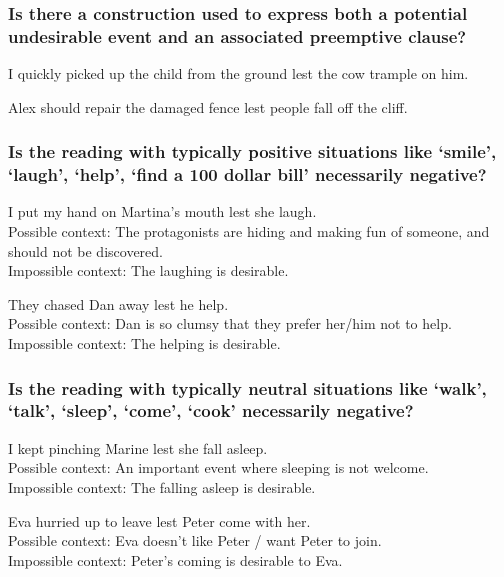 \documentclass[output=paper,colorlinks,citecolor=brown]{langscibook}
\begin{document}
\subsubsection{Is there a construction used to express both a potential undesirable event and an associated preemptive clause?}
\label{2.1.1}

\ea \label{p43} I quickly picked up the child from the ground {\ob}lest the cow trample on him{\cb}.
\z

\ea \label{p44} Alex should repair the damaged fence {\ob}lest people fall off the cliff{\cb}.
\z

\subsubsection{Is the reading with \textbf{typically positive situations} like `smile', `laugh', `help', `find a 100 dollar bill' necessarily negative?}
\label{2.1.2}

\ea \label{p45} I put my hand on Martina's mouth lest she laugh. \\
\textnormal{Possible context: The protagonists are hiding and making fun of someone, and should not be discovered. }\\
\textnormal{Impossible context: The laughing is desirable.}
\z

\ea \label{p46} They chased Dan away lest he help. \\
\textnormal{Possible context: Dan is so clumsy that they prefer her/him not to help. }\\
\textnormal{Impossible context: The helping is desirable.}
\z


\subsubsection{Is the reading with \textbf{typically neutral situations} like `walk', `talk', `sleep', `come', `cook' necessarily negative?}
\label{2.1.3}

\ea \label{p47} I kept pinching Marine lest she fall asleep. \\
\textnormal{Possible context: An important event where sleeping is not welcome.} \\
\textnormal{Impossible context: The falling asleep is desirable.}
\z

\ea \label{p48}Eva hurried up to leave lest Peter come with her. \\
\textnormal{Possible context: Eva doesn't like Peter \textnormal{/} want Peter to join.} \\
\textnormal{Impossible context: Peter's coming is desirable to Eva.}
\z
\end{document}
